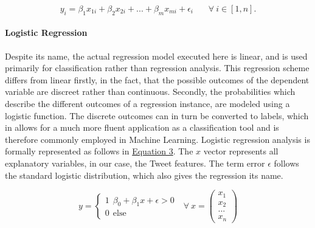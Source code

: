 	\begin{equation}
	y_i = \beta_1 x_{1i}+ \beta_2 x_{2i} + ... + \beta_m x_{mi} + \epsilon_i \ \ \ \ \ \ \ \ 
	\forall \ i \in [1,n].
	\label{Linear_Regression}
	\end{equation}
	
	\paragraph{Logistic Regression} Despite its name, the actual regression model executed here is linear, and is used primarily for classification rather than regression analysis. This regression scheme differs from linear firstly, in the fact, that the possible outcomes of the dependent variable are discreet rather than continuous. Secondly, the probabilities which describe the different outcomes of a regression instance, are modeled using a logistic function. The discrete outcomes can in turn be converted to labels, which in allows for a much more fluent application as a classification tool and is therefore commonly employed in  Machine Learning. Logistic regression analysis is formally represented as follows in  \hyperref[logit]{Equation 3}. The $x$ vector represents all explanatory variables, in our case, the Tweet features. The term error $\epsilon$ follows the standard logistic distribution, which also gives the regression its name. 
	
	\begin{equation}
	y = 
	\begin{cases}
	1 \ \  \beta_0 + \beta_1 x + \epsilon > 0 \\
	0 \ \  \text{else } 
	\end{cases} \text{         } \forall \  x = 
	\begin{pmatrix}x_1\\x_2\\...\\x_n \end{pmatrix}
	\label{logit}
	\end{equation}
	
